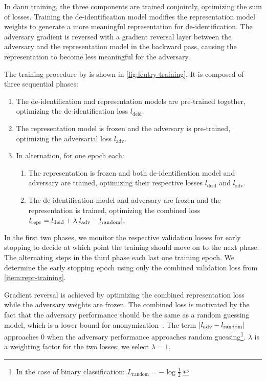 \begin{description}
    In \ac{dann} training, the three components are trained conjointly, optimizing the sum of losses.
    Training the de-identification model modifies the representation model weights to generate a more meaningful representation for de-identification.
    The adversary gradient is reversed with a gradient reversal layer between the adversary and the representation model in the backward pass, causing the representation to become less meaningful for the adversary.
    
    The training procedure by \citet{feutry2018learning} is shown in \cref{fig:feutry-training}.
    It is composed of three sequential phases:
    \begin{enumerate}[label=P\arabic*.,ref=P\arabic*]
        \item The de-identification and representation models are pre-trained together, optimizing the de-identification loss $l_{\text{deid}}$.
        \item The representation model is frozen and the adversary is pre-trained, optimizing the adversarial loss $l_{\text{adv}}$.
        \item In alternation, for one epoch each:
        \begin{enumerate}
            \item The representation is frozen and both de-identification model and adversary are trained, optimizing their respective losses $l_{\text{deid}}$ and $l_{\text{adv}}$.
            \item The de-identification model and adversary are frozen and the representation is trained, optimizing the combined loss $l_{\text{repr}} = l_{\text{deid}} + \lambda \lvert l_{\text{adv}} - l_{\text{random}}\rvert$. \label{item:repr-training}
        \end{enumerate}
    \end{enumerate}
    
    In the first two phases, we monitor the respective validation losses for early stopping to decide at which point the training should move on to the next phase.
    The alternating steps in the third phase each last one training epoch.
    We determine the early stopping epoch using only the combined validation loss from \ref{item:repr-training}.
    
    Gradient reversal is achieved by optimizing the combined representation loss while the adversary weights are frozen.
    The combined loss is motivated by the fact that the adversary performance should be the same as a random guessing model, which is a lower bound for anonymization~\citep{feutry2018learning}.
    The term $\lvert l_{\text{adv}} - l_{\text{random}}\rvert$ approaches $0$ when the adversary performance approaches random guessing\footnote{In the case of binary classification: $L_{\text{random}} = -\log \frac{1}{2}$.}.
    $\lambda$ is a weighting factor for the two losses; we select $\lambda=1$.
\end{description}

